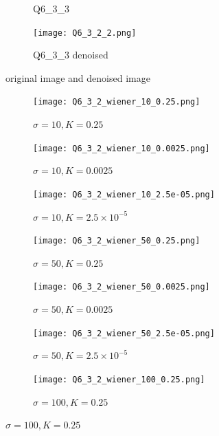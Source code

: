\documentclass[
	12pt, %
]{style/fphw}
\begin{document}
\begin{figure}[H]
\begin{subfigure}[b]{.24\textwidth}
			\caption{Q6\_3\_3}
			\label{Q6_3_3}
		\end{subfigure}
		\hfill
		\begin{subfigure}[b]{.24\textwidth}
			\centering
			\texttt{[image: Q6\_3\_2\_2.png]}
			\caption{Q6\_3\_3 denoised}
			\label{Q6_3_2_2}
		\end{subfigure}
		\caption{original image and denoised image}
		\label{original image and denoised image}	
	\end{figure}

	\begin{figure}[H]
		\centering
			\begin{subfigure}[b]{.3\textwidth}
				\centering
				\texttt{[image: Q6\_3\_2\_wiener\_10\_0.25.png]}
				\caption{$\sigma=10, K=0.25$}
				\label{Q6_3_2_wiener_10_0.25}
			\end{subfigure}
			\hfill
			\begin{subfigure}[b]{.3\textwidth}
				\centering
				\texttt{[image: Q6\_3\_2\_wiener\_10\_0.0025.png]}
				\caption{$\sigma=10, K=0.0025$}
				\label{Q6_3_2_wiener_10_0.0025}
			\end{subfigure}
			\hfill
			\begin{subfigure}[b]{.3\textwidth}
				\centering
				\texttt{[image: Q6\_3\_2\_wiener\_10\_2.5e-05.png]}
				\caption{$\sigma=10, K=2.5 \times 10^{-5}$}
				\label{Q6_3_2_wiener_10_2.5e-05}
			\end{subfigure}
		\vfill
			\begin{subfigure}[b]{.3\textwidth}
				\centering
				\texttt{[image: Q6\_3\_2\_wiener\_50\_0.25.png]}
				\caption{$\sigma=50, K=0.25$}
				\label{Q6_3_2_wiener_50_0.25}
			\end{subfigure}
			\hfill
			\begin{subfigure}[b]{.3\textwidth}
				\centering
				\texttt{[image: Q6\_3\_2\_wiener\_50\_0.0025.png]}
				\caption{$\sigma=50, K=0.0025$}
				\label{Q6_3_2_wiener_50_0.0025}
			\end{subfigure}
			\hfill
			\begin{subfigure}[b]{.3\textwidth}
				\centering
				\texttt{[image: Q6\_3\_2\_wiener\_50\_2.5e-05.png]}
				\caption{$\sigma=50, K=2.5 \times 10^{-5}$}
				\label{Q6_3_2_wiener_50_2.5e-05}
			\end{subfigure}
		\vfill
			\begin{subfigure}[b]{.3\textwidth}
				\centering
				\texttt{[image: Q6\_3\_2\_wiener\_100\_0.25.png]}
				\caption{$\sigma=100, K=0.25$}
				\label{Q6_3_2_wiener_100_0.25}
			\end{subfigure}

\end{figure}
\end{document}
